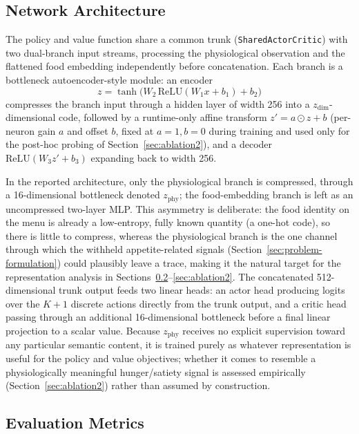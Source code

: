 \documentclass[10pt,twocolumn]{article}
\begin{document}
\subsection{Network Architecture}
\label{sec:network}

The policy and value function share a common trunk (\texttt{SharedActorCritic}) with two dual-branch input streams, processing the physiological observation and the flattened food embedding independently before concatenation. Each branch is a bottleneck autoencoder-style module: an encoder
\begin{equation}
z = \tanh\!\big(W_2\,\text{ReLU}(W_1x+b_1)+b_2\big)
\end{equation}
compresses the branch input through a hidden layer of width 256 into a $z_\text{dim}$-dimensional code, followed by a runtime-only affine transform $z'=a\odot z+b$ (per-neuron gain $a$ and offset $b$, fixed at $a{=}1,b{=}0$ during training and used only for the post-hoc probing of Section~\ref{sec:ablation2}), and a decoder $\text{ReLU}(W_3z'+b_3)$ expanding back to width 256.

In the reported architecture, only the physiological branch is compressed, through a 16-dimensional bottleneck denoted $z_\text{phy}$; the food-embedding branch is left as an uncompressed two-layer MLP. This asymmetry is deliberate: the food identity on the menu is already a low-entropy, fully known quantity (a one-hot code), so there is little to compress, whereas the physiological branch is the one channel through which the withheld appetite-related signals (Section~\ref{sec:problem-formulation}) could plausibly leave a trace, making it the natural target for the representation analysis in Sections~\ref{sec:metrics}--\ref{sec:ablation2}. The concatenated 512-dimensional trunk output feeds two linear heads: an actor head producing logits over the $K{+}1$ discrete actions directly from the trunk output, and a critic head passing through an additional 16-dimensional bottleneck before a final linear projection to a scalar value. Because $z_\text{phy}$ receives no explicit supervision toward any particular semantic content, it is trained purely as whatever representation is useful for the policy and value objectives; whether it comes to resemble a physiologically meaningful hunger/satiety signal is assessed empirically (Section~\ref{sec:ablation2}) rather than assumed by construction.

\subsection{Evaluation Metrics}
\label{sec:metrics}
\end{document}
